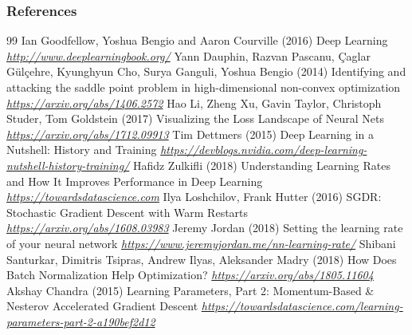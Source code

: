 \documentclass[11pt,compress,t,notes=noshow, xcolor=table]{beamer}
\begin{document}
\begin{vbframe}
\frametitle{References}
\footnotesize{
\begin{thebibliography}{99}
 Ian Goodfellow, Yoshua Bengio and Aaron Courville (2016)
\newblock Deep Learning
\newblock \emph{\url{http://www.deeplearningbook.org/}}
 Yann Dauphin, Razvan Pascanu, {\c{C}}aglar G{\"{u}}l{\c{c}}ehre, Kyunghyun Cho, Surya Ganguli, Yoshua Bengio (2014)
\newblock Identifying and attacking the saddle point problem in high-dimensional non-convex optimization
\newblock \emph{\url{https://arxiv.org/abs/1406.2572}}
 Hao Li, Zheng Xu, Gavin Taylor, Christoph Studer, Tom Goldstein (2017)
\newblock Visualizing the Loss Landscape of Neural Nets
\newblock \emph{\url{https://arxiv.org/abs/1712.09913}}
 Tim Dettmers (2015)
\newblock Deep Learning in a Nutshell: History and Training
\newblock \emph{\url{https://devblogs.nvidia.com/deep-learning-nutshell-history-training/}}
 Hafidz Zulkifli (2018)
\newblock Understanding Learning Rates and How It Improves Performance in Deep Learning
\newblock \emph{\url{https://towardsdatascience.com}}
 Ilya Loshchilov, Frank Hutter (2016)
\newblock SGDR: Stochastic Gradient Descent with Warm Restarts
\newblock \emph{\url{https://arxiv.org/abs/1608.03983}}
 Jeremy Jordan (2018)
\newblock Setting the learning rate of your neural network
\newblock \emph{\url{https://www.jeremyjordan.me/nn-learning-rate/}}
 Shibani Santurkar, Dimitris Tsipras, Andrew Ilyas, Aleksander Madry (2018)
\newblock How Does Batch Normalization Help Optimization?
\newblock \emph{\url{https://arxiv.org/abs/1805.11604}}
 Akshay Chandra (2015) 
\newblock Learning Parameters, Part 2: Momentum-Based \& Nesterov Accelerated Gradient Descent
\newblock \emph{\url{https://towardsdatascience.com/learning-parameters-part-2-a190bef2d12}}
\end{thebibliography}
}
\end{vbframe}

\endlecture
\end{document}
